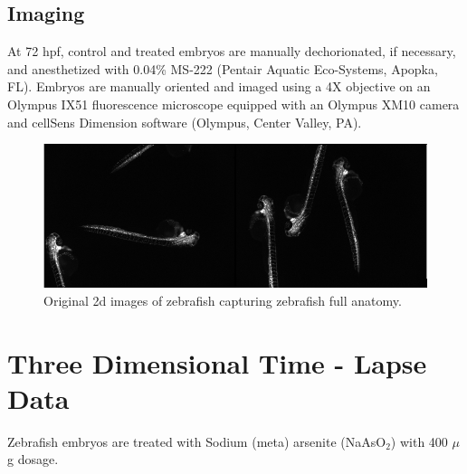 \subsection{Imaging}
At 72 hpf, control and treated embryos are manually dechorionated, if necessary, and anesthetized with 0.04\% MS-222 (Pentair Aquatic Eco-Systems, Apopka, FL). Embryos are manually oriented and imaged using a 4X objective on an Olympus IX51 fluorescence microscope equipped with an Olympus XM10 camera and cellSens Dimension software (Olympus, Center Valley, PA).

\begin{figure}[htb] 
 \begin{center}
    \includegraphics[scale=0.75]{figure/fishData.png}
  \end{center}
  \caption[Zebrafish full anatomy 2d dataset]{Original 2d images of zebrafish capturing zebrafish full anatomy.}
 \label{2dFish}
\end{figure}


\section{Three Dimensional Time - Lapse Data}

Zebrafish embryos are treated with Sodium (meta) arsenite (NaAsO$_{2}$) with 400 $\mu$g dosage. 

